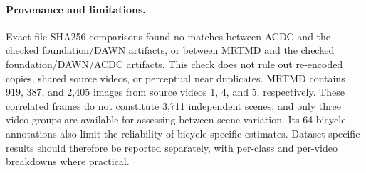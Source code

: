 \paragraph{Provenance and limitations.}
Exact-file SHA256 comparisons found no matches between ACDC and the checked
foundation/DAWN artifacts, or between MRTMD and the checked
foundation/DAWN/ACDC artifacts. This check does not rule out re-encoded copies,
shared source videos, or perceptual near duplicates. MRTMD contains 919,
387, and 2,405 images from source videos 1, 4, and 5, respectively. These
correlated frames do not constitute 3,711 independent scenes, and only three
video groups are available for assessing between-scene variation. Its 64
bicycle annotations also limit the reliability of bicycle-specific estimates.
Dataset-specific results should therefore be reported separately, with
per-class and per-video breakdowns where practical.

